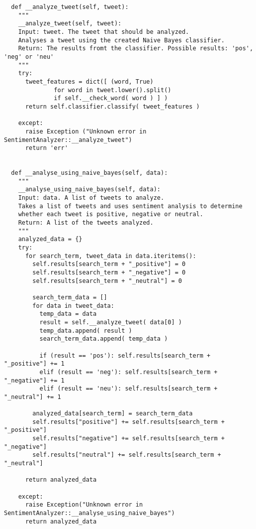\begin{verbatim}
  def __analyze_tweet(self, tweet):
    """
    __analyze_tweet(self, tweet):
    Input: tweet. The tweet that should be analyzed.
    Analyses a tweet using the created Naive Bayes classifier.
    Return: The results fromt the classifier. Possible results: 'pos', 'neg' or 'neu'
    """
    try:
      tweet_features = dict([ (word, True) 
              for word in tweet.lower().split() 
              if self.__check_word( word ) ] )
      return self.classifier.classify( tweet_features )
    
    except:
      raise Exception ("Unknown error in SentimentAnalyzer::__analyze_tweet")
      return 'err'


  def __analyse_using_naive_bayes(self, data):
    """
    __analyse_using_naive_bayes(self, data):
    Input: data. A list of tweets to analyze.
    Takes a list of tweets and uses sentiment analysis to determine 
    whether each tweet is positive, negative or neutral.
    Return: A list of the tweets analyzed.
    """
    analyzed_data = {}
    try:
      for search_term, tweet_data in data.iteritems():
        self.results[search_term + "_positive"] = 0
        self.results[search_term + "_negative"] = 0
        self.results[search_term + "_neutral"] = 0
        
        search_term_data = []
        for data in tweet_data:
          temp_data = data
          result = self.__analyze_tweet( data[0] )
          temp_data.append( result )
          search_term_data.append( temp_data )
          
          if (result == 'pos'): self.results[search_term + "_positive"] += 1
          elif (result == 'neg'): self.results[search_term + "_negative"] += 1
          elif (result == 'neu'): self.results[search_term + "_neutral"] += 1
        
        analyzed_data[search_term] = search_term_data
        self.results["positive"] += self.results[search_term + "_positive"]
        self.results["negative"] += self.results[search_term + "_negative"]
        self.results["neutral"] += self.results[search_term + "_neutral"]
      
      return analyzed_data
    
    except:
      raise Exception("Unknown error in SentimentAnalyzer::__analyse_using_naive_bayes")
      return analyzed_data
\end{verbatim}

